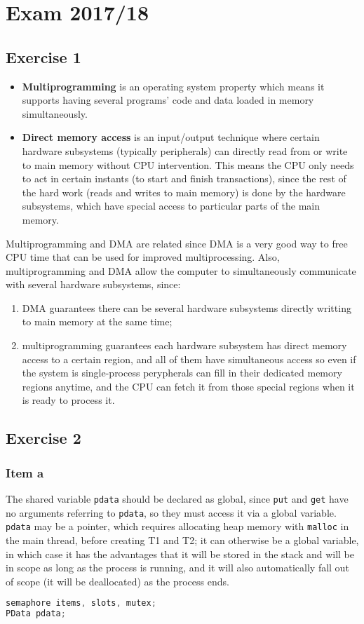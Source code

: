 \setcounter{chapter}{17}
\chapter{Exam 2017/18}
{
\renewcommand{\thesubsection}{\thesection\alph{subsection}}
\section{Exercise 1}
\begin{itemize}
    \item \textbf{Multiprogramming} is an operating system property which means it supports having several programs' code and data loaded in memory simultaneously.
    \item \textbf{Direct memory access} is an input/output technique where certain hardware subsystems (typically peripherals) can directly read from or write to main memory without CPU intervention. This means the CPU only needs to act in certain instants (to start and finish transactions), since the rest of the hard work (reads and writes to main memory) is done by the hardware subsystems, which have special access to particular parts of the main memory.
\end{itemize}
Multiprogramming and DMA are related since DMA is a very good way to free CPU time that can be used for improved multiprocessing. Also, multiprogramming and DMA allow the computer to simultaneously communicate with several hardware subsystems, since:
\begin{enumerate}
    \item DMA guarantees there can be several hardware subsystems directly writting to main memory at the same time;
    \item multiprogramming guarantees each hardware subsystem has direct memory access to a certain region, and all of them have simultaneous access so even if the system is single-process perypherals can fill in their dedicated memory regions anytime, and the CPU can fetch it from those special regions when it is ready to process it.
\end{enumerate}

\section{Exercise 2}
\subsection{Item a}
The shared variable \texttt{pdata} should be declared as global, since \texttt{put} and \texttt{get} have no arguments referring to \texttt{pdata}, so they must access it via a global variable. \texttt{pdata} may be a pointer, which requires allocating heap memory with \texttt{malloc} in the main thread, before creating T1 and T2; it can otherwise be a global variable, in which case it has the advantages that it will be stored in the stack and will be in scope as long as the process is running, and it will also automatically fall out of scope (it will be deallocated) as the process ends. \par
\begin{lstlisting}[language=C]
semaphore items, slots, mutex;
PData pdata;


\end{lstlisting}}
